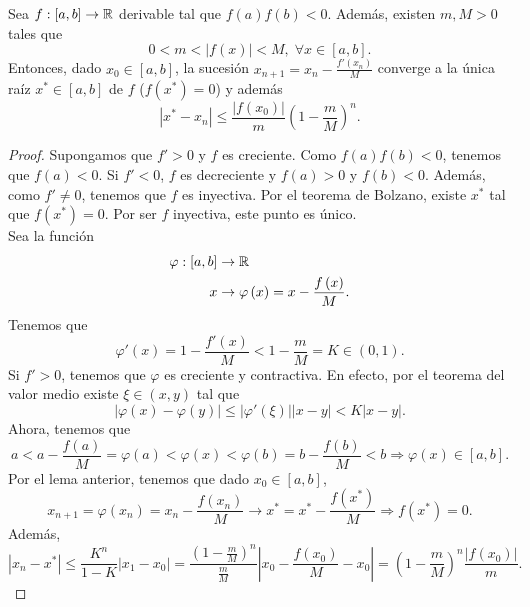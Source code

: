 \begin{ftheorem}[]
	\normalfont Sea $\displaystyle f: \left[a,b\right] \to \mathbb{R} $ derivable tal que $\displaystyle f\left(a\right)f\left(b\right) < 0 $. Además, existen $\displaystyle m,M > 0 $ tales que 
	\[ 0 < m < \left|f\left(x\right)\right| < M , \; \forall x \in \left[a,b\right]  .\]
	Entonces, dado $\displaystyle x_{0} \in \left[a,b\right]  $, la sucesión $\displaystyle x_{n+1} = x_{n}-\frac{f'\left(x_{n}\right)}{M} $ converge a la única raíz $\displaystyle x^{*} \in \left[a,b\right]  $ de $\displaystyle f $ ($\displaystyle f\left(x^{*}\right) = 0 $) y además
	\[ \left|x^{*}-x_{n}\right| \leq \frac{ \left|f\left(x_{0}\right)\right|}{m}\left(1-\frac{m}{M}\right)^{n} .\]
\end{ftheorem}
\begin{proof}
Supongamos que $\displaystyle f' > 0 $ y $\displaystyle f $ es creciente. Como $\displaystyle f\left(a\right)f\left(b\right) < 0 $, tenemos que $\displaystyle f\left(a\right) < 0 $. Si $\displaystyle f' < 0 $, $\displaystyle f $ es decreciente y $\displaystyle f\left(a\right) > 0 $ y $\displaystyle f\left(b\right) < 0 $. Además, como $\displaystyle f' \neq 0 $, tenemos que $\displaystyle f $ es inyectiva. Por el teorema de Bolzano, existe $\displaystyle x^{*} $ tal que $\displaystyle f\left(x^{*}\right) = 0 $. Por ser $\displaystyle f $ inyectiva, este punto es único.\\ 
Sea la función 
\[
\begin{split}
	\varphi : \left[a,b\right] & \to \mathbb{R}\\
	x & \to \varphi\left(x\right) = x - \frac{f\left(x\right)}{M}.
\end{split}
\]
Tenemos que 
\[\varphi'\left(x\right) = 1 - \frac{f'\left(x\right)}{M} < 1 - \frac{m}{M} = K \in \left(0,1\right) .\]
Si $\displaystyle f' > 0 $, tenemos que $\displaystyle \varphi $ es creciente y contractiva. En efecto, por el teorema del valor medio existe $\displaystyle \xi \in \left(x,y\right) $ tal que
\[ \left|\varphi\left(x\right)-\varphi\left(y\right)\right| \leq \left|\varphi'\left(\xi\right)\right| \left|x-y\right| < K \left|x-y\right|.\]
Ahora, tenemos que 
\[a < a - \frac{f\left(a\right)}{M} = \varphi\left(a\right) < \varphi\left(x\right) < \varphi\left(b\right) = b - \frac{f\left(b\right)}{M} < b \Rightarrow \varphi\left(x\right) \in \left[a,b\right]  .\]
Por el lema anterior, tenemos que dado $\displaystyle x_{0} \in \left[a,b\right]  $,
\[x_{n+1} = \varphi\left(x_{n}\right) = x_{n}-\frac{f\left(x_{n}\right)}{M} \to x^{*} = x^{*} - \frac{f\left(x^{*}\right)}{M} \Rightarrow f\left(x^{*}\right) = 0.\]
Además, 
\[ \left|x_{n}-x^{*}\right| \leq \frac{K^{n}}{1-K} \left|x_{1}-x_{0}\right| = \frac{\left(1-\frac{m}{M}\right)^{n}}{\frac{m}{M}} \left|x_{0}-\frac{f\left(x_{0}\right)}{M}-x_{0}\right| = \left(1-\frac{m}{M}\right)^{n}\frac{ \left|f\left(x_{0}\right)\right|}{m} .\]
\end{proof}
